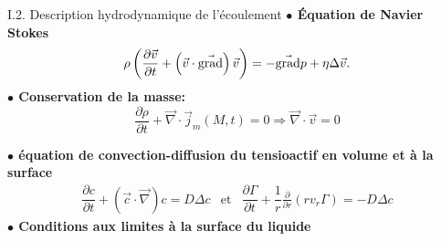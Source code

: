 \documentclass[aspectratio=169,10pt]{beamer}
\begin{document}
  \begin{frame}{I.2. Description hydrodynamique de l'écoulement}
    \noindent \textbf{$\bullet$  Équation de Navier Stokes}
      \begin{equation}
        \rho\left(\dfrac{\partial \vec{v}}{\partial t}+\left(\vec{v}\cdot\vec{\rm grad}\right)\vec{v}\right)=-\vec{\rm grad}p+\eta\Delta\vec{v}.\label{eq:NS1}
      \end{equation}
  \noindent \textbf{$\bullet$ Conservation de la masse:}
    \begin{equation}
    \dfrac{\partial \rho}{\partial t}+\vec{\nabla}\cdot\vec{j}_m(M,t)=0\Rightarrow\vec{\nabla}\cdot \vec{v} = 0
  \end{equation} 

  \noindent \textbf{$\bullet$ équation de convection-diffusion du tensioactif en volume et à la surface}
    \begin{equation}
      \begin{array}{ccc}      
  \dfrac{\partial c}{\partial t}+\left(\vec{c}\cdot \vec{\nabla}\right)c = D\Delta c & \text{et} &  \dfrac{\partial \Gamma}{\partial t}+\dfrac{1}{r}\frac{\partial }{\partial r}\left(rv_r\Gamma\right) = -D\Delta c 
      \end{array}
\end{equation}
  \noindent\textbf{$\bullet$  Conditions aux limites à la surface du liquide} %
    \begin{figure}
      \centering
    \end{figure}

  \end{frame}
\end{document}
